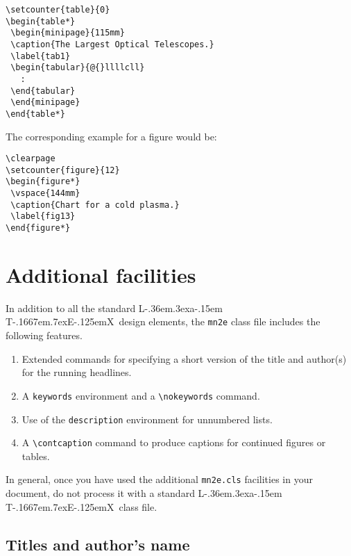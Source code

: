 \documentclass[useAMS,usenatbib]{mn2e}
\def\LaTeX{L\kern-.36em\raise.3ex\hbox{a}\kern-.15em
    T\kern-.1667em\lower.7ex\hbox{E}\kern-.125emX}
\begin{document}
\begin{enumerate}
\begin{verbatim}
\setcounter{table}{0}
\begin{table*}
 \begin{minipage}{115mm}
 \caption{The Largest Optical Telescopes.}
 \label{tab1}
 \begin{tabular}{@{}llllcll}
   :
 \end{tabular}
 \end{minipage}
\end{table*}
\end{verbatim}
%
The corresponding example for a figure would be:
%
\begin{verbatim}
\clearpage
\setcounter{figure}{12}
\begin{figure*}
 \vspace{144mm}
 \caption{Chart for a cold plasma.}
 \label{fig13}
\end{figure*}
\end{verbatim}
\end{enumerate}


\section{Additional facilities}

In addition to all the standard \LaTeX\ design elements, the {\tt mn2e}
class file includes the following features.
%
\begin{enumerate}
  \item Extended commands for specifying a short version of the title and
        author(s) for the running headlines.
  \item A \verb"keywords" environment and a \verb"\nokeywords" command.
  \item Use of the \verb"description" environment for unnumbered lists.
  \item A \verb"\contcaption" command to produce captions for continued
        figures or tables.
 \end{enumerate}
%
In general, once you have used the additional \verb"mn2e.cls" facilities in
your document, do not process it with a standard \LaTeX\ class file.

\subsection{Titles and author's name}
\end{document}
